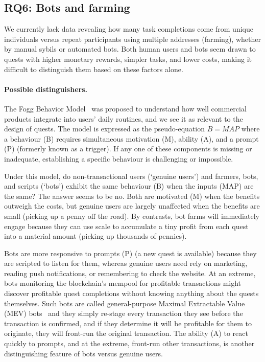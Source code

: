 
\subsection{RQ6: Bots and farming}

We currently lack data revealing how many task completions come from unique individuals versus repeat participants using multiple addresses (farming), whether by manual sybils or automated bots. Both human users and bots seem drawn to quests with higher monetary rewards, simpler tasks, and lower costs, making it difficult to distinguish them based on these factors alone.

\paragraph{Possible distinguishers.} The Fogg Behavior Model~\cite{Fogg09} was proposed to understand how well commercial products integrate into users’ daily routines, and we see it as relevant to the design of quests. The model is expressed as the pseudo-equation $B=MAP$ where a behaviour (B) requires simultaneous motivation (M), ability (A), and a prompt (P) (formerly known as a trigger). If any one of these components is missing or inadequate, establishing a specific behaviour is challenging or impossible.

Under this model, do non-transactional users (`genuine users') and farmers, bots, and scripts (`bots') exhibit the same behaviour (B) when the inputs (MAP) are the same? The answer seems to be no. Both are motivated (M) when the benefits outweigh the costs, but genuine users are largely unaffected when the benefits are small (\cf picking up a penny off the road). By contrasts, bot farms will immediately engage because they can use scale to accumulate a tiny profit from each quest into a material amount (\cf picking up thousands of pennies).

Bots are more responsive to prompts (P) (\eg a new quest is available) because they are scripted to listen for them, whereas genuine users need rely on marketing, reading push notifications, or remembering to check the website. At an extreme, bots monitoring the blockchain's mempool for profitable transactions might discover profitable quest completions without knowing anything about the quests themselves. Such bots are called general-purpose Maximal Extractable Value (MEV) bots~\cite{DGK+20} and they simply re-stage every transaction they see before the transaction is confirmed, and if they determine it will be profitable for them to originate, they will front-run the original transaction. The ability (A) to react quickly to prompts, and at the extreme, front-run other transactions, is another distinguishing feature of bots versus genuine users. 

